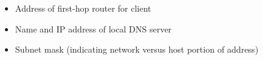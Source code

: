 \begin{itemize}
\begin{itemize}
        \begin{itemize}

          \item Address of first-hop router for client

          \item Name and IP address of local DNS server

          \item Subnet mask (indicating network versus host portion of address)

        \end{itemize}

    \end{itemize}

\end{itemize}




